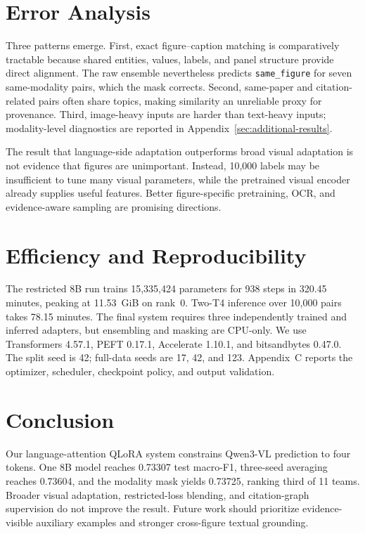 \documentclass[11pt]{article}
\newcommand{\sfclass}{\texttt{same\_figure}}
\begin{document}
\section{Error Analysis}

Three patterns emerge.  First, exact figure--caption matching is comparatively tractable because shared entities, values, labels, and panel structure provide direct alignment.  The raw ensemble nevertheless predicts \sfclass{} for seven same-modality pairs, which the mask corrects.  Second, same-paper and citation-related pairs often share topics, making similarity an unreliable proxy for provenance.  Third, image-heavy inputs are harder than text-heavy inputs; modality-level diagnostics are reported in Appendix~\ref{sec:additional-results}.

The result that language-side adaptation outperforms broad visual adaptation is not evidence that figures are unimportant.  Instead, 10,000 labels may be insufficient to tune many visual parameters, while the pretrained visual encoder already supplies useful features.  Better figure-specific pretraining, OCR, and evidence-aware sampling are promising directions.

\section{Efficiency and Reproducibility}

The restricted 8B run trains 15,335,424 parameters for 938 steps in 320.45 minutes, peaking at 11.53~GiB on rank~0.  Two-T4 inference over 10,000 pairs takes 78.15 minutes.  The final system requires three independently trained and inferred adapters, but ensembling and masking are CPU-only.  We use Transformers 4.57.1, PEFT 0.17.1, Accelerate 1.10.1, and bitsandbytes 0.47.0.  The split seed is 42; full-data seeds are 17, 42, and 123.  Appendix~C reports the optimizer, scheduler, checkpoint policy, and output validation.

\section{Conclusion}

Our language-attention QLoRA system constrains Qwen3-VL prediction to four tokens.  One 8B model reaches 0.73307 test macro-F1, three-seed averaging reaches 0.73604, and the modality mask yields 0.73725, ranking third of 11 teams.  Broader visual adaptation, restricted-loss blending, and citation-graph supervision do not improve the result.  Future work should prioritize evidence-visible auxiliary examples and stronger cross-figure textual grounding.
\end{document}
